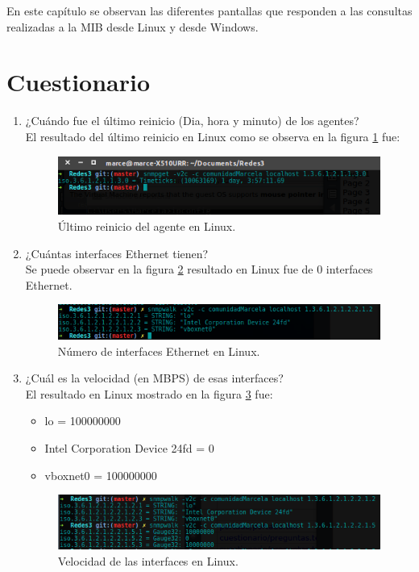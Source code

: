 En este capítulo se observan las diferentes pantallas que responden a las consultas realizadas a la MIB desde Linux y desde Windows.
\section{Cuestionario}
\begin{enumerate}
\item ¿Cuándo fue el último reinicio (Dia, hora y minuto)  de los agentes?
\\ El resultado del último reinicio en Linux como se observa en la figura \ref{image:reinicio} fue:

\FloatBarrier
\begin{figure}[htbp!]
		\centering
			\includegraphics[width=.9 \textwidth]{images/Pregunta1}
		\caption{Último reinicio del agente en Linux.}
		\label{image:reinicio}
\end{figure}
\FloatBarrier

\item ¿Cuántas interfaces Ethernet tienen?
\\ Se puede observar en la figura \ref{image:interfaces} resultado en Linux fue de 0 interfaces Ethernet.
\FloatBarrier
\begin{figure}[htbp!]
		\centering
			\includegraphics[width=.9 \textwidth]{images/Pregunta2L}
		\caption{Número de interfaces Ethernet en Linux.}
		\label{image:interfaces}
\end{figure}
\FloatBarrier

\item ¿Cuál es la velocidad (en MBPS) de esas interfaces?
\\ El resultado en Linux mostrado en la figura \ref{image:velocidadInterfaces} fue:
\begin{itemize}
\item lo = 100000000
\item Intel Corporation Device 24fd = 0 
\item vboxnet0 = 100000000
\end{itemize}
\FloatBarrier
\begin{figure}[htbp!]
		\centering
			\includegraphics[width=.9 \textwidth]{images/Pregunta3L}
		\caption{Velocidad de las interfaces en Linux.}
		\label{image:velocidadInterfaces}
\end{figure}
\FloatBarrier


\end{enumerate}

